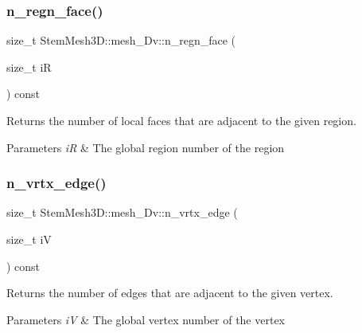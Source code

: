 \subsubsection{\texorpdfstring{n\+\_\+regn\+\_\+face()}{n\_regn\_face()}}
{\footnotesize\ttfamily size\+\_\+t Stem\+Mesh3\+D\+::mesh\+\_\+Dv\+::n\+\_\+regn\+\_\+face (\begin{DoxyParamCaption}\item[{size\+\_\+t}]{iR }\end{DoxyParamCaption}) const}



Returns the number of local faces that are adjacent to the given region. 


\begin{DoxyParams}{Parameters}
{\em iR} & The global region number of the region \\
\hline
\end{DoxyParams}
\mbox{\label{classStemMesh3D_1_1mesh__3Dv_a9996181afbb34b235ef0877471eb4fb3}} 
\subsubsection{\texorpdfstring{n\+\_\+vrtx\+\_\+edge()}{n\_vrtx\_edge()}}
{\footnotesize\ttfamily size\+\_\+t Stem\+Mesh3\+D\+::mesh\+\_\+Dv\+::n\+\_\+vrtx\+\_\+edge (\begin{DoxyParamCaption}\item[{size\+\_\+t}]{iV }\end{DoxyParamCaption}) const}



Returns the number of edges that are adjacent to the given vertex. 


\begin{DoxyParams}{Parameters}
{\em iV} & The global vertex number of the vertex \\
\hline
\end{DoxyParams}
\mbox{\label{classStemMesh3D_1_1mesh__3Dv_a1a6eaa9ed8ebf41ada912b834f34e7c6}} 
